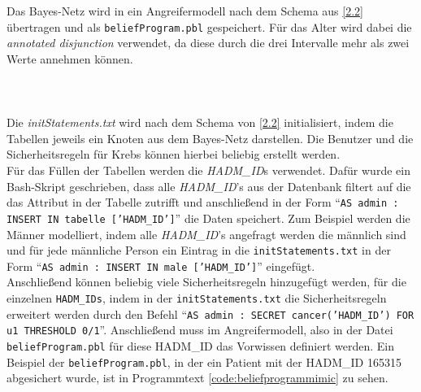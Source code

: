 \documentclass[german,version-2020-11]{uzl-thesis}
\begin{document}
\begin{figure}[ht]
\end{figure}Das Bayes-Netz wird in ein Angreifermodell nach dem Schema aus \ref{2.2} übertragen und als \texttt{beliefProgram.pbl} gespeichert. Für das Alter wird dabei die \textit{annotated disjunction} verwendet, da diese durch die drei Intervalle mehr als zwei Werte annehmen können. \\ \\ \\ \\
Die \textit{initStatements.txt} wird nach dem Schema von \ref{2.2} initialisiert, indem die Tabellen jeweils ein Knoten aus dem Bayes-Netz darstellen. Die Benutzer und die Sicherheitsregeln für Krebs können hierbei beliebig erstellt werden.\\  Für das Füllen der Tabellen werden die \textit{HADM\_ID}s verwendet. Dafür wurde ein Bash-Skript geschrieben, dass alle \textit{HADM\_ID}'s  aus der Datenbank filtert auf die das Attribut in der Tabelle zutrifft und anschließend in der Form \enquote{\texttt{AS admin : INSERT IN tabelle ['HADM\_ID']}} die Daten speichert. Zum Beispiel werden die Männer modelliert, indem alle \textit{HADM\_ID}'s angefragt werden die männlich sind und für jede männliche Person ein Eintrag in die \texttt{initStatements.txt} in der Form \enquote{\texttt{AS admin : INSERT IN male ['HADM\_ID']}} eingefügt. \\ 
Anschließend können beliebig viele Sicherheitsregeln hinzugefügt werden, für die einzelnen \texttt{HADM\_IDs}, indem in der \texttt{initStatements.txt} die Sicherheitsregeln erweitert werden durch den Befehl \enquote{\texttt{AS admin : SECRET cancer('HADM\_ID') FOR u1 THRESHOLD 0/1}}. Anschließend muss im Angreifermodell, also in der Datei \texttt{beliefProgram.pbl} für diese HADM\_ID das Vorwissen definiert werden. Ein Beispiel der \texttt{beliefProgram.pbl}, in der ein Patient mit der HADM\_ID 165315 abgesichert wurde, ist in Programmtext  \ref{code:beliefprogrammimic} zu sehen. \\
\end{document}
